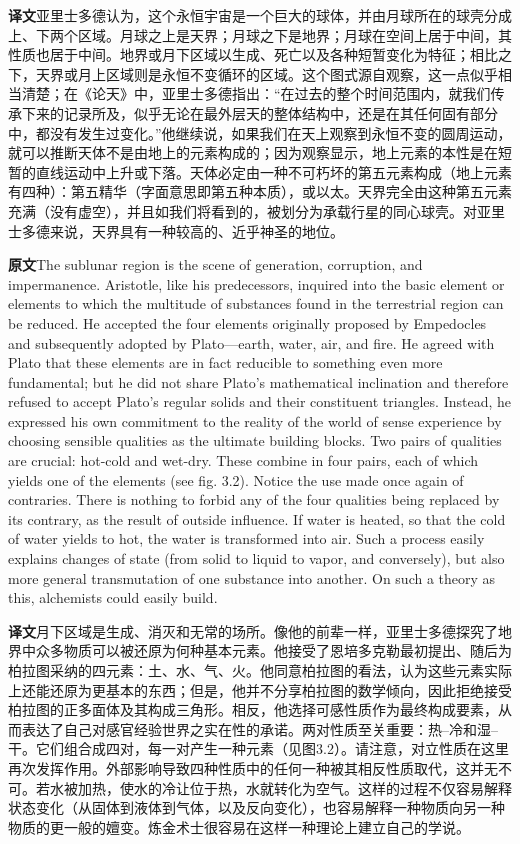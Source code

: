\documentclass[UTF8,zihao=-4]{ctexart}
\newcommand{\BodyFont}{\fontsize{10.5pt}{15.5pt}\selectfont}
\newcommand{\origlabel}{\textbf{原文}\quad}
\newcommand{\translabel}{\textbf{译文}\quad}
\newcommand{\orig}{\par\noindent\begingroup\BodyFont\origlabel}
\newcommand{\zhline}[1]{\par\endgroup\noindent\begingroup\BodyFont\translabel #1\par\endgroup\vspace{0.35em}}
\begin{document}
\zhline{亚里士多德认为，这个永恒宇宙是一个巨大的球体，并由月球所在的球壳分成上、下两个区域。月球之上是天界；月球之下是地界；月球在空间上居于中间，其性质也居于中间。地界或月下区域以生成、死亡以及各种短暂变化为特征；相比之下，天界或月上区域则是永恒不变循环的区域。这个图式源自观察，这一点似乎相当清楚；在《论天》中，亚里士多德指出：“在过去的整个时间范围内，就我们传承下来的记录所及，似乎无论在最外层天的整体结构中，还是在其任何固有部分中，都没有发生过变化。”他继续说，如果我们在天上观察到永恒不变的圆周运动，就可以推断天体不是由地上的元素构成的；因为观察显示，地上元素的本性是在短暂的直线运动中上升或下落。天体必定由一种不可朽坏的第五元素构成（地上元素有四种）：第五精华（字面意思即第五种本质），或以太。天界完全由这种第五元素充满（没有虚空），并且如我们将看到的，被划分为承载行星的同心球壳。对亚里士多德来说，天界具有一种较高的、近乎神圣的地位。}

\orig The sublunar region is the scene of generation, corruption, and impermanence. Aristotle, like his predecessors, inquired into the basic element or elements to which the multitude of substances found in the terrestrial region can be reduced. He accepted the four elements originally proposed by Empedocles and subsequently adopted by Plato---earth, water, air, and fire. He agreed with Plato that these elements are in fact reducible to something even more fundamental; but he did not share Plato's mathematical inclination and therefore refused to accept Plato's regular solids and their constituent triangles. Instead, he expressed his own commitment to the reality of the world of sense experience by choosing sensible qualities as the ultimate building blocks. Two pairs of qualities are crucial: hot-cold and wet-dry. These combine in four pairs, each of which yields one of the elements (see fig. 3.2). Notice the use made once again of contraries. There is nothing to forbid any of the four qualities being replaced by its contrary, as the result of outside influence. If water is heated, so that the cold of water yields to hot, the water is transformed into air. Such a process easily explains changes of state (from solid to liquid to vapor, and conversely), but also more general transmutation of one substance into another. On such a theory as this, alchemists could easily build.

\zhline{月下区域是生成、消灭和无常的场所。像他的前辈一样，亚里士多德探究了地界中众多物质可以被还原为何种基本元素。他接受了恩培多克勒最初提出、随后为柏拉图采纳的四元素：土、水、气、火。他同意柏拉图的看法，认为这些元素实际上还能还原为更基本的东西；但是，他并不分享柏拉图的数学倾向，因此拒绝接受柏拉图的正多面体及其构成三角形。相反，他选择可感性质作为最终构成要素，从而表达了自己对感官经验世界之实在性的承诺。两对性质至关重要：热--冷和湿--干。它们组合成四对，每一对产生一种元素（见图3.2）。请注意，对立性质在这里再次发挥作用。外部影响导致四种性质中的任何一种被其相反性质取代，这并无不可。若水被加热，使水的冷让位于热，水就转化为空气。这样的过程不仅容易解释状态变化（从固体到液体到气体，以及反向变化），也容易解释一种物质向另一种物质的更一般的嬗变。炼金术士很容易在这样一种理论上建立自己的学说。}
\end{document}
